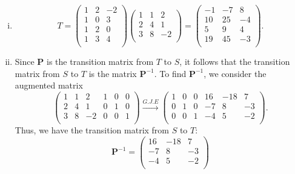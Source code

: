 \documentclass{article}
\newcommand{\bs}[1]{\boldsymbol{#1}}
\begin{document}
\begin{enumerate}[(i)]
\item $$T = \left(\begin{array}{ccc}
     1 & 2 & -2 \\
     1 & 0 & 3\\
     1 & 2 & 0 \\
     1 & 3 & 4 \\
    \end{array}\right)\left(\begin{array}{ccc}
     1 & 1 & 2 \\
     2 & 4 & 1\\
    3 & 8 & -2  \\
    \end{array}\right) = \left(\begin{array}{ccc}
     -1 & -7 & 8 \\
     10 & 25 & -4\\
     5 & 9 & 4 \\
     19 & 45 & -3 \\
    \end{array}\right).$$
    \item Since $\bs{P}$ is the transition matrix from $T$ to $S$, it follows that the transition matrix from $S$ to $T$ is the matrix $\bs{P}^{-1}$. To find $\bs{P}^{-1}$, we consider the augmented matrix
    $$\left(\begin{array}{ccc|ccc}
     1 & 1 & 2 & 1 & 0 & 0 \\
     2 & 4 & 1 & 0 & 1 & 0\\
    3 & 8 & -2 & 0 & 0 & 1 \\
    \end{array}\right) \xrightarrow[]{G.J.E} \left(\begin{array}{ccc|ccc}
      1 & 0 & 0 & 16 & -18 & 7 \\
      0 & 1 & 0 & -7 & 8 & -3\\
     0 & 0 & 1 & -4 & 5 & -2\\
    \end{array}\right).$$
    Thus, we have the transition matrix from $S$ to $T$:
    $$\bs{P}^{-1} = \left(\begin{array}{ccc}
      16 & -18 & 7 \\
      -7 & 8 & -3\\
      -4 & 5 & -2\\
    \end{array}\right)$$
    
\end{enumerate}
\newpage
\end{document}
